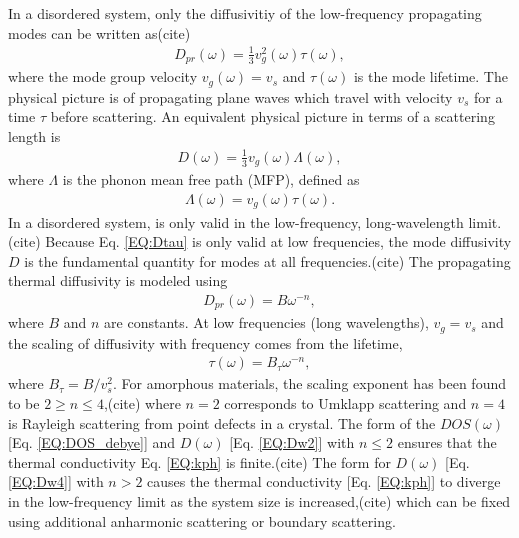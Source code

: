 \documentclass[aps,prb,twocolumn,superscriptaddress,footinbib,amsmath,amssymb,floatfix]{revtex4}
\begin{document}
In a disordered system, only the diffusivitiy of the low-frequency 
propagating modes can be written as(cite)     
\begin{equation}\label{EQ:Dtau}
\begin{split}
D_{pr}(\omega) = \frac{1}{3}v^2_g(\omega)\tau(\omega),
\end{split}
\end{equation}
where the mode group velocity $v_g(\omega) = v_s$ and $\tau(\omega)$ is 
the mode lifetime. 
The physical picture is of propagating plane waves which 
travel with velocity $v_s$ for a time $\tau$ before scattering. 
An equivalent physical picture in terms of a scattering length 
is
\begin{equation}\label{EQ:DLambda}
\begin{split}
D(\omega) = \frac{1}{3}v_g(\omega) \Lambda(\omega),
\end{split}
\end{equation}
where $\Lambda$ is the phonon mean free path (MFP), defined as 
\begin{equation}\label{EQ:Lambda}
\begin{split}
\Lambda(\omega) = v_{g}(\omega) \tau(\omega).
\end{split}
\end{equation}
In a disordered system,  is only valid in the 
low-frequency, long-wavelength limit.(cite) 
Because Eq. \eqref{EQ:Dtau} is only valid at low frequencies, 
the mode diffusivity $D$ is the fundamental quantity for modes at all 
frequencies.(cite)  
The propagating thermal diffusivity is modeled using 
\begin{equation}\label{EQ:Dw2}
\begin{split}
D_{pr}(\omega) = B\omega^{-n}, 
\end{split}
\end{equation}
where $B$ and $n$ are constants.   
At low frequencies (long wavelengths), $v_g = v_s$ and the scaling of 
diffusivity with frequency comes from the lifetime, 
\begin{equation}\label{EQ:tauw2}
\begin{split}
\tau(\omega) = B_{\tau} \omega^{-n},
\end{split}
\end{equation}
where $B_{\tau} = B/v_s^2$. For amorphous materials, the scaling exponent has been 
found to be $2\ge n \le 4$,(cite) 
where $n=2$ corresponds to 
Umklapp scattering\cite{callaway_model_1959} and $n=4$ is Rayleigh scattering 
from point defects in a crystal.\cite{klemens_scattering_1955}
The form of the $DOS(\omega)$ [Eq. \eqref{EQ:DOS_debye}] 
and $D(\omega)$ [Eq. \eqref{EQ:Dw2}] with $n\le2$  
ensures that the 
thermal conductivity Eq. \eqref{EQ:kph} is finite.(cite) The form for $D(\omega)$ 
[Eq. \eqref{EQ:Dw4}] with $n>2$ causes the thermal conductivity 
[Eq. \eqref{EQ:kph}] to diverge 
in the low-frequency limit as the system size is increased,(cite) 
which can be fixed using additional anharmonic scattering
\cite{feldman_thermal_1993,feldman_numerical_1999} or 
boundary scattering.\cite{cahill_lower_1994,liu_high_2009,yang_anomalously_2010}
\end{document}
